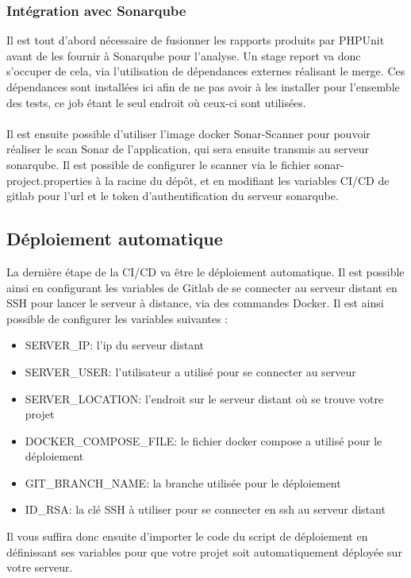 \documentclass{article}
\begin{document}
            \subsubsection{Intégration avec Sonarqube}

                Il est tout d'abord nécessaire de fusionner les rapports produits par PHPUnit avant de les fournir à Sonarqube pour l'analyse. Un stage report va donc s'occuper de cela, via l'utilisation de dépendances externes réalisant le merge. Ces dépendances sont installées ici afin de ne pas avoir à les installer pour l'ensemble des tests, ce job étant le seul endroit où ceux-ci sont utilisées. \\
                \\
                \indent Il est ensuite possible d'utiliser l'image docker Sonar-Scanner pour pouvoir réaliser le scan Sonar de l'application, qui sera ensuite transmis au serveur sonarqube. Il est possible de configurer le scanner via le fichier sonar-project.properties à la racine du dépôt, et en modifiant les variables CI/CD de gitlab pour l'url et le token d'authentification du serveur sonarqube.
            
        \subsection{Déploiement automatique}

            La dernière étape de la CI/CD va être le déploiement automatique. Il est possible ainsi en configurant les variables de Gitlab de se connecter au serveur distant en SSH pour lancer le serveur à distance, via des commandes Docker. Il est ainsi possible de configurer les variables suivantes :
            \begin{itemize}
                \item SERVER\_IP: l'ip du serveur distant
                \item SERVER\_USER: l'utilisateur a utilisé pour se connecter au serveur
                \item SERVER\_LOCATION: l'endroit sur le serveur distant où se trouve votre projet
                \item DOCKER\_COMPOSE\_FILE: le fichier docker compose a utilisé pour le déploiement
                \item GIT\_BRANCH\_NAME: la branche utilisée pour le déploiement
                \item ID\_RSA: la clé SSH à utiliser pour se connecter en ssh au serveur distant\\
            \end{itemize}
            \indent Il vous suffira donc ensuite d'importer le code du script de déploiement en définissant ses variables pour que votre projet soit automatiquement déployée sur votre serveur.
\end{document}
